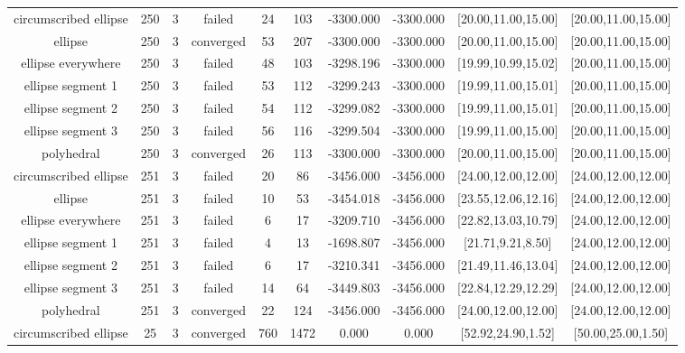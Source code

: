 \begin{tiny}
\begin{center}
\begin{longtable}{ c c c c c c c c c c }
  circumscribed ellipse   &  250  &  3  &   failed   &   24  &  103  & -3300.000  & -3300.000  & [20.00,11.00,15.00] & [20.00,11.00,15.00] \\
         ellipse          &  250  &  3  & converged  &   53  &  207  & -3300.000  & -3300.000  & [20.00,11.00,15.00] & [20.00,11.00,15.00] \\
    ellipse everywhere    &  250  &  3  &   failed   &   48  &  103  & -3298.196  & -3300.000  & [19.99,10.99,15.02] & [20.00,11.00,15.00] \\
    ellipse segment 1     &  250  &  3  &   failed   &   53  &  112  & -3299.243  & -3300.000  & [19.99,11.00,15.01] & [20.00,11.00,15.00] \\
    ellipse segment 2     &  250  &  3  &   failed   &   54  &  112  & -3299.082  & -3300.000  & [19.99,11.00,15.01] & [20.00,11.00,15.00] \\
    ellipse segment 3     &  250  &  3  &   failed   &   56  &  116  & -3299.504  & -3300.000  & [19.99,11.00,15.00] & [20.00,11.00,15.00] \\
        polyhedral        &  250  &  3  & converged  &   26  &  113  & -3300.000  & -3300.000  & [20.00,11.00,15.00] & [20.00,11.00,15.00] \\
  circumscribed ellipse   &  251  &  3  &   failed   &   20  &   86  & -3456.000  & -3456.000  & [24.00,12.00,12.00] & [24.00,12.00,12.00] \\
         ellipse          &  251  &  3  &   failed   &   10  &   53  & -3454.018  & -3456.000  & [23.55,12.06,12.16] & [24.00,12.00,12.00] \\
    ellipse everywhere    &  251  &  3  &   failed   &   6   &   17  & -3209.710  & -3456.000  & [22.82,13.03,10.79] & [24.00,12.00,12.00] \\
    ellipse segment 1     &  251  &  3  &   failed   &   4   &   13  & -1698.807  & -3456.000  & [21.71,9.21,8.50] & [24.00,12.00,12.00] \\
    ellipse segment 2     &  251  &  3  &   failed   &   6   &   17  & -3210.341  & -3456.000  & [21.49,11.46,13.04] & [24.00,12.00,12.00] \\
    ellipse segment 3     &  251  &  3  &   failed   &   14  &   64  & -3449.803  & -3456.000  & [22.84,12.29,12.29] & [24.00,12.00,12.00] \\
        polyhedral        &  251  &  3  & converged  &   22  &  124  & -3456.000  & -3456.000  & [24.00,12.00,12.00] & [24.00,12.00,12.00] \\
  circumscribed ellipse   &   25  &  3  & converged  &  760  &  1472 &   0.000    &   0.000    & [52.92,24.90,1.52] & [50.00,25.00,1.50] \\

\end{longtable}
\end{center}
\end{tiny}
